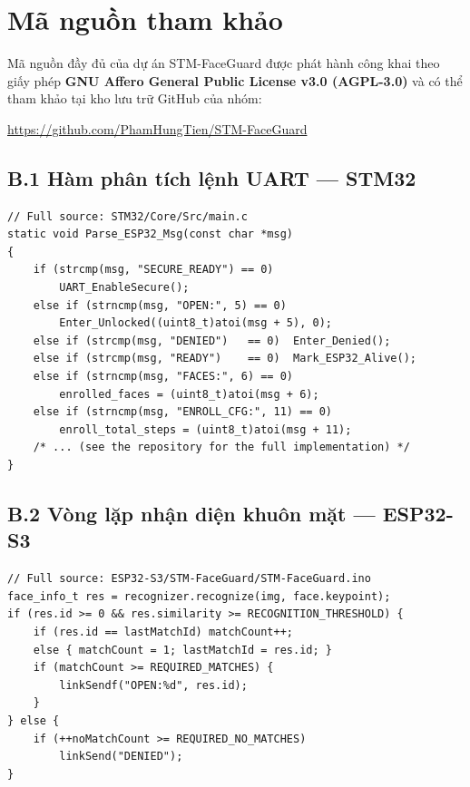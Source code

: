 \chapter{Mã nguồn tham khảo}
\label{app:code}

Mã nguồn đầy đủ của dự án STM-FaceGuard được phát hành công khai
theo giấy phép \textbf{GNU Affero General Public License v3.0 (AGPL-3.0)}
và có thể tham khảo tại kho lưu trữ GitHub của nhóm:
\begin{center}
  \url{https://github.com/PhamHungTien/STM-FaceGuard}
\end{center}

\section*{B.1 \quad Hàm phân tích lệnh UART --- STM32}

\begin{lstlisting}[style=cstyle,
  caption={Hàm \texttt{Parse\_ESP32\_Msg} --- phân tích giao thức ESP32 $\to$ STM32},
  label={lst:parse_msg}]
// Full source: STM32/Core/Src/main.c
static void Parse_ESP32_Msg(const char *msg)
{
    if (strcmp(msg, "SECURE_READY") == 0)
        UART_EnableSecure();
    else if (strncmp(msg, "OPEN:", 5) == 0)
        Enter_Unlocked((uint8_t)atoi(msg + 5), 0);
    else if (strcmp(msg, "DENIED")   == 0)  Enter_Denied();
    else if (strcmp(msg, "READY")    == 0)  Mark_ESP32_Alive();
    else if (strncmp(msg, "FACES:", 6) == 0)
        enrolled_faces = (uint8_t)atoi(msg + 6);
    else if (strncmp(msg, "ENROLL_CFG:", 11) == 0)
        enroll_total_steps = (uint8_t)atoi(msg + 11);
    /* ... (see the repository for the full implementation) */
}
\end{lstlisting}

\section*{B.2 \quad Vòng lặp nhận diện khuôn mặt --- ESP32-S3}

\begin{lstlisting}[style=cstyle,
  caption={Voting pipeline nhận diện khuôn mặt (ESP32-S3)},
  label={lst:fr_loop}]
// Full source: ESP32-S3/STM-FaceGuard/STM-FaceGuard.ino
face_info_t res = recognizer.recognize(img, face.keypoint);
if (res.id >= 0 && res.similarity >= RECOGNITION_THRESHOLD) {
    if (res.id == lastMatchId) matchCount++;
    else { matchCount = 1; lastMatchId = res.id; }
    if (matchCount >= REQUIRED_MATCHES) {
        linkSendf("OPEN:%d", res.id);
    }
} else {
    if (++noMatchCount >= REQUIRED_NO_MATCHES)
        linkSend("DENIED");
}
\end{lstlisting}

